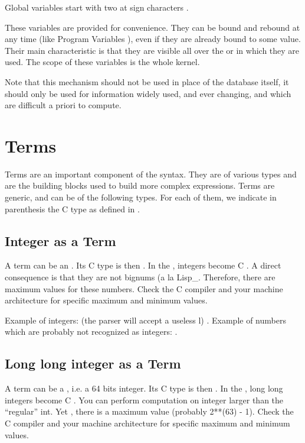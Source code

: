 Global variables start with two at sign characters .

These variables are provided for convenience. They can be bound and rebound
at any time (like Program Variables ), even if
they are already bound to some value. Their main characteristic is that
they are visible all over the \CPK{} or \XPK{} in which they are used.
The scope of these variables is the whole kernel.

Note that this mechanism should not be used in place of the database itself, it
should only be used for information widely used, and ever changing, and which
are difficult a priori to compute.

\section{Terms}

Terms are an important component of the \COPRS{} syntax. They  are of various
types and are the building blocks used to build more complex
expressions.  Terms are generic, and can be of the following types. For each of
them, we indicate in parenthesis the C type as defined in
.



\subsection{Integer as a Term}

A term can be an .  Its C type is then . In the \CPK{},
integers become C . A direct consequence is that they are not
bignums (a la Lisp_. Therefore, there are maximum values for these numbers. Check the C
compiler and your machine architecture for specific maximum and minimum
values.

Example of integers: (the parser will accept a useless l) . \*
Example of numbers which are probably not recognized as integers:
.

\subsection{Long long integer as a Term}

A term can be a , i.e. a 64 bits integer.  Its C type
is then . In the \CPK{}, long long integers become C
. You can perform computation on integer larger than the
``regular'' int. Yet , there is a maximum value (probably 2**(63) - 1). Check the C compiler
and your machine architecture for specific maximum and minimum values.

